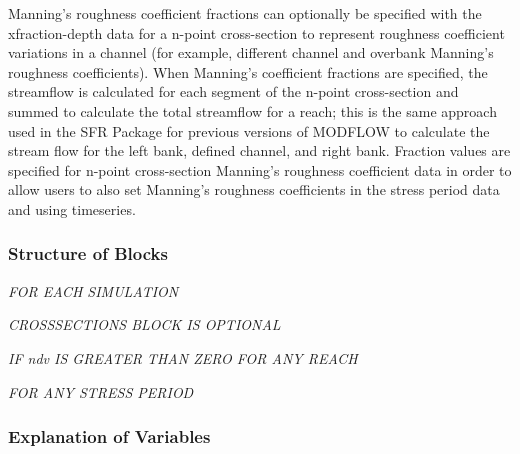 Manning's roughness coefficient fractions can optionally be specified with the xfraction-depth data for a n-point cross-section to represent roughness coefficient variations in a channel (for example, different channel and overbank Manning's roughness coefficients). When Manning's coefficient fractions are specified, the streamflow is calculated for each segment of the n-point cross-section and summed to calculate the total streamflow for a reach; this is the same approach used in the SFR Package for previous versions of MODFLOW \citep{modflowsfr1pack} to calculate the stream flow for the left bank, defined channel, and right bank. Fraction values are specified for n-point cross-section Manning's roughness coefficient data in order to allow users to also set Manning's roughness coefficients in the stress period data and using timeseries.

\vspace{5mm}
\subsubsection{Structure of Blocks}

\vspace{5mm}
\noindent \textit{FOR EACH SIMULATION}




\vspace{5mm}
\noindent \textit{CROSSSECTIONS BLOCK IS OPTIONAL}




\vspace{5mm}
\noindent \textit{IF ndv IS GREATER THAN ZERO FOR ANY REACH}


\vspace{5mm}
\noindent \textit{FOR ANY STRESS PERIOD}


\vspace{5mm}
\subsubsection{Explanation of Variables}
\begin{description}

\end{description}

